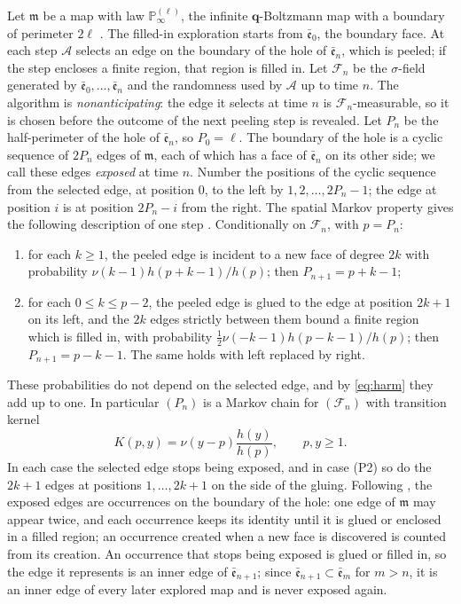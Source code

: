 \documentclass[11pt]{amsart}
\theoremstyle{remark}
\numberwithin{equation}{section}
\newcommand{\1}{\mathbf 1}
\newcommand{\F}{\mathcal F}
\begin{document}
Let $\mathfrak m$ be a map with law $\mathbb P^{(\ell)}_\infty$, the infinite $\mathbf q$-Boltzmann map with a boundary of perimeter $2\ell$ \cite[Theorem~8]{Cur}. The filled-in exploration starts from $\bar{\mathfrak e}_0$, the boundary face. At each step $\mathcal A$ selects an edge on the boundary of the hole of $\bar{\mathfrak e}_n$, which is peeled; if the step encloses a finite region, that region is filled in. Let $\F_n$ be the $\sigma$-field generated by $\bar{\mathfrak e}_0,\dots,\bar{\mathfrak e}_n$ and the randomness used by $\mathcal A$ up to time $n$. The algorithm is \emph{nonanticipating}: the edge it selects at time $n$ is $\F_n$-measurable, so it is chosen before the outcome of the next peeling step is revealed. Let $P_n$ be the half-perimeter of the hole of $\bar{\mathfrak e}_n$, so $P_0=\ell$. The boundary of the hole is a cyclic sequence of $2P_n$ edges of $\mathfrak m$, each of which has a face of $\bar{\mathfrak e}_n$ on its other side; we call these edges \emph{exposed} at time $n$. Number the positions of the cyclic sequence from the selected edge, at position $0$, to the left by $1,2,\dots,2P_n-1$; the edge at position $i$ is at position $2P_n-i$ from the right. The spatial Markov property gives the following description of one step \cite[Section~4.2]{Cur}. Conditionally on $\F_n$, with $p=P_n$:
\begin{enumerate}[label=(P\arabic*),leftmargin=*]
\item for each $k\ge1$, the peeled edge is incident to a new face of degree $2k$ with probability $\nu(k-1)h(p+k-1)/h(p)$; then $P_{n+1}=p+k-1$;
\item for each $0\le k\le p-2$, the peeled edge is glued to the edge at position $2k+1$ on its left, and the $2k$ edges strictly between them bound a finite region which is filled in, with probability $\frac12\nu(-k-1)h(p-k-1)/h(p)$; then $P_{n+1}=p-k-1$. The same holds with left replaced by right.
\end{enumerate}
These probabilities do not depend on the selected edge, and by \eqref{eq:harm} they add up to one. In particular $(P_n)$ is a Markov chain for $(\F_n)$ with transition kernel
\begin{equation}\label{eq:K}
K(p,y)=\nu(y-p)\frac{h(y)}{h(p)},\qquad p,y\ge1 .
\end{equation}
In each case the selected edge stops being exposed, and in case (P2) so do the $2k+1$ edges at positions $1,\dots,2k+1$ on the side of the gluing. Following \cite[Section~3.1]{Cur}, the exposed edges are occurrences on the boundary of the hole: one edge of $\mathfrak m$ may appear twice, and each occurrence keeps its identity until it is glued or enclosed in a filled region; an occurrence created when a new face is discovered is counted from its creation. An occurrence that stops being exposed is glued or filled in, so the edge it represents is an inner edge of $\bar{\mathfrak e}_{n+1}$; since $\bar{\mathfrak e}_{n+1}\subset\bar{\mathfrak e}_{m}$ for $m>n$, it is an inner edge of every later explored map and is never exposed again.
\end{document}
